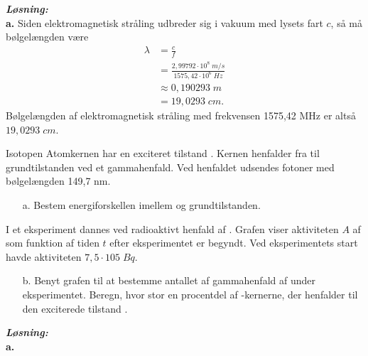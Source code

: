 \documentclass{report}
\newcommand{\sol}{\setlength{\parindent}{0cm}\textbf{\textit{Løsning:}}\setlength{\parindent}{1cm}}
\begin{document}
\sol \\
\textbf{a.}
Siden elektromagnetisk stråling udbreder sig i vakuum med lysets fart $c$, så må bølgelængden være
\begin{equation*}
\begin{split}
  \lambda &=\frac{c}{f}\\
  &=\frac{2,99792 \cdot 10 ^{8} \;\unit{m/s} }{1575,42 \cdot 10^6 \;\unit{Hz}}\\
  &\approx 0,190293 \;\unit{m} \\
  &=19,0293 \;\unit{cm}.
\end{split}
\end{equation*}
Bølgelængden af elektromagnetisk stråling med frekvensen 1575,42 MHz er altså $19,0293 \;\unit{cm} $.

\begin{question}{Isotopen }{}
Atomkernen  har en exciteret tilstand . 
Kernen henfalder fra  til grundtilstanden ved et gammahenfald. Ved henfaldet udsendes fotoner med bølgelængden 149,7 nm.
\begin{itemize}
  \item[a.] Bestem energiforskellen imellem  og grundtilstanden.
\end{itemize}
I et eksperiment dannes  ved radioaktivt henfald af .
Grafen viser aktiviteten $A$ af  som funktion af tiden $t$ efter eksperimentet er begyndt.
Ved eksperimentets start havde  aktiviteten $7,5 \cdot 105 \;\unit{Bq}$.
\begin{itemize}
  \item[b.] Benyt grafen til at bestemme antallet af gammahenfald af  under eksperimentet.
  Beregn, hvor stor en procentdel af -kernerne, der henfalder til den exciterede tilstand .
\end{itemize}
\end{question}
\sol \\
\textbf{a.}
\end{document}
